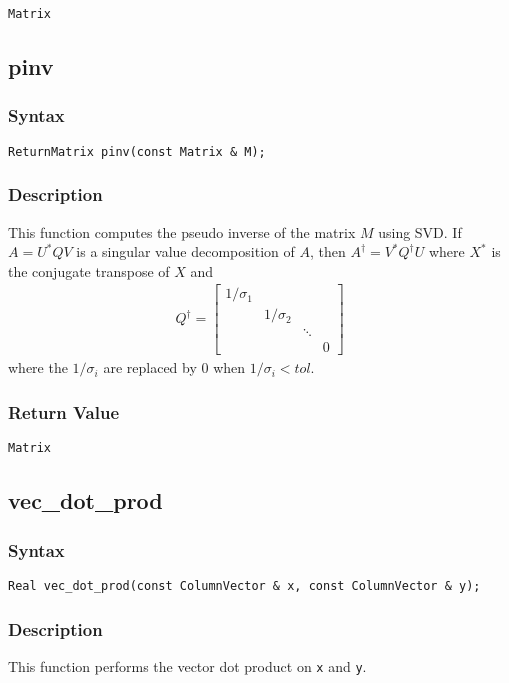 \documentclass[11pt,fleqn,letterpaper]{report}
\begin{document}
{\tt Matrix}

\newpage

\subsection*{pinv}
\subsubsection*{Syntax}
\begin{verbatim}
ReturnMatrix pinv(const Matrix & M);
\end{verbatim}
\subsubsection*{Description}
This function computes the pseudo inverse of the matrix $M$ using SVD.
If $ A = U^{*}QV $ is a singular value decomposition of $A$, then $
A^{\dagger} = V^{*}Q^{\dagger}U$ where $ X^{*} $ is the conjugate
transpose of $ X $ and
\begin{eqnarray*}
  Q^{\dagger} = \left [
    \begin{array}{cccc}
      1/\sigma_1 & & & \\
      & 1/\sigma_2& & \\
      &  & \ddots & \\
      &  &  & 0
    \end{array}
  \right ]
\end{eqnarray*}
where the $1/\sigma_i $ are replaced by 0 when $1/\sigma_i < tol $.


\subsubsection*{Return Value}

{\tt Matrix}
\newpage

\subsection*{vec\_dot\_prod}
\subsubsection*{Syntax}
\begin{verbatim}
Real vec_dot_prod(const ColumnVector & x, const ColumnVector & y);
\end{verbatim}
\subsubsection*{Description}
This function performs the vector dot product on {\tt x} and {\tt y}.
\end{document}
